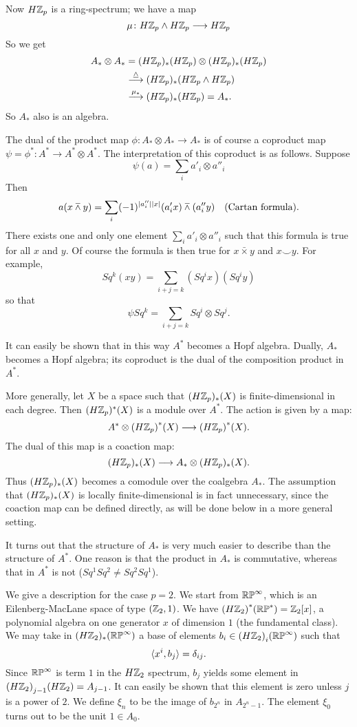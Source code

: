 \documentclass[../main]{subfiles}
\begin{document}
Now $H\mathbb{Z}_p$ is a ring-spectrum; we have a map
\[ \mu\colon H\mathbb{Z}_p\wedge H\mathbb{Z}_p\longrightarrow H\mathbb{Z}_p \]
So we get
\begin{align*}
    A_\ast\otimes A_\ast &= (H\mathbb{Z}_p)_\ast(H\mathbb{Z}_p)\otimes(H\mathbb{Z}_p)_\ast(H\mathbb{Z}_p) \\
    &\overset{\underline{\wedge}}\longrightarrow(H\mathbb{Z}_p)_\ast(H\mathbb{Z}_p\wedge H\mathbb{Z}_p) \\
    &\overset{\mu_\ast}\longrightarrow(H\mathbb{Z}_p)_\ast(H\mathbb{Z}_p)=A_\ast.
\end{align*}
So $A_\ast$ also is an algebra.

The dual of the product map $\phi\colon A_\ast\otimes A_\ast\longrightarrow A_\ast$ is of course a coproduct map $\psi=\phi^\ast\colon A^\ast\longrightarrow A^\ast\otimes A^\ast$. The interpretation of this coproduct is as follows. Suppose
\[ \psi(a) = \sum_ia'_i\otimes a''_i \]
Then
\[ a(x\barwedge y)=\sum_i(-1)^{\lvert a''_i\rvert\lvert x\rvert}(a'_ix)\barwedge(a''_iy) \quad \text{(Cartan formula).} \]
There exists one and only one element $\sum\limits_i a'_i\otimes a''_i$ such that this formula is true for all $x$ and $y$. Of course the formula is then true for $x\bar\times y$ %
and $x\smile y$. %
For example,
\[ Sq^k(xy)=\sum_{i+j=k} (Sq^ix)(Sq^iy) \]
so that
\[ \psi Sq^k=\sum_{i+j=k} Sq^i\otimes Sq^j. \]

It can easily be shown that in this way $A^\ast$ becomes a Hopf algebra. Dually, $A_\ast$ becomes a Hopf algebra; its coproduct is the dual of the composition product in $A^\ast$.

More generally, let $X$ be a space such that $(H\mathbb{Z}_p)_\ast(X)$ is finite-dimensional in each degree. Then $(H\mathbb{Z}_p)^\ast(X)$ is a module over $A^\ast$. The action is given by a map:
\[ A^\ast\otimes{(H\mathbb{Z}_p)}^\ast(X)\longrightarrow{(H\mathbb{Z}_p)}^\ast(X) . \]
The dual of this map is a coaction map:
\[ (H\mathbb{Z}_p)_\ast(X)\longrightarrow A_\ast\otimes(H\mathbb{Z}_p)_\ast(X) . \]
Thus $(H\mathbb{Z}_p)_\ast(X)$ becomes a comodule over the coalgebra $A_\ast$. The assumption that $(H\mathbb{Z}_p)_\ast(X)$ is locally finite-dimensional is in fact unnecessary, since the coaction map can be defined directly, as will be done below in a more general setting.

It turns out that the structure of $A_\ast$ is very much easier to describe than the structure of $A^\ast$. One reason is that the product in $A_\ast$ is commutative, whereas that in $A^\ast$ is not ($Sq^1Sq^2\neq Sq^2Sq^1$).

We give a description for the case $p=2$. We start from $\mathbb{RP}^\infty$, which is an Eilenberg-MacLane space of type $(\mathbb{Z}_2,1)$. We have ${(H\mathbb{Z}_2)}^\ast(\mathbb{RP}^\ast)=\mathbb{Z}_2[x]$, a polynomial algebra on one generator $x$ of dimension $1$ (the fundamental class). We may take in $(H\mathbb{Z}_2)_\ast(\mathbb{RP}^\infty)$ a base of elements $b_i\in{(H\mathbb{Z}_2)}_i(\mathbb{RP}^\infty)$ such that
\[ \langle x^i, b_j\rangle = \delta_{ij} . \]
Since $\mathbb{RP}^\infty$ is term $1$ in the $H\mathbb{Z}_2$ spectrum, $b_j$ yields some element in ${(H\mathbb{Z}_2)}_{j-1}(H\mathbb{Z}_2)=A_{j-1}$. It can easily be shown that this element is zero unless $j$ is a power of $2$. We define $\xi_n$ to be the image of $b_{2^n}$ in $A_{2^n-1}$. The element $\xi_0$ turns out to be the unit $1\in A_0$.
\end{document}
